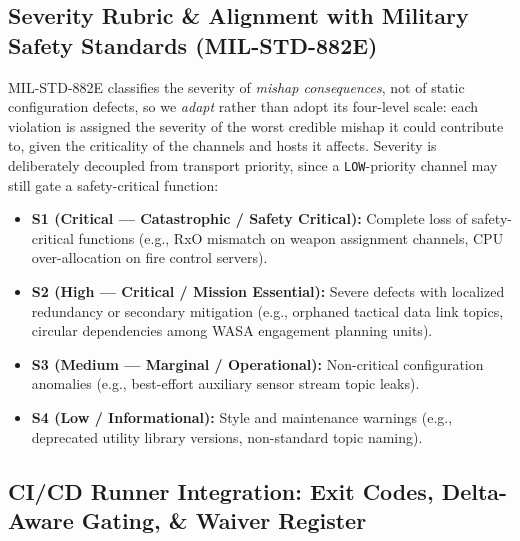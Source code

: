 \documentclass[sigconf,9pt]{acmart}
\begin{document}
\subsection{Severity Rubric \& Alignment with Military Safety Standards (MIL-STD-882E)}

MIL-STD-882E classifies the severity of \emph{mishap consequences}, not of static configuration defects, so we \emph{adapt} rather than adopt its four-level scale: each violation is assigned the severity of the worst credible mishap it could contribute to, given the criticality of the channels and hosts it affects. Severity is deliberately decoupled from transport priority, since a \texttt{LOW}-priority channel may still gate a safety-critical function:
\begin{itemize}\itemsep=0.5pt
    \item \textbf{S1 (Critical --- Catastrophic / Safety Critical):} Complete loss of safety-critical functions (e.g., RxO mismatch on weapon assignment channels, CPU over-allocation on fire control servers).
    \item \textbf{S2 (High --- Critical / Mission Essential):} Severe defects with localized redundancy or secondary mitigation (e.g., orphaned tactical data link topics, circular dependencies among WASA engagement planning units).
    \item \textbf{S3 (Medium --- Marginal / Operational):} Non-critical configuration anomalies (e.g., best-effort auxiliary sensor stream topic leaks).
    \item \textbf{S4 (Low / Informational):} Style and maintenance warnings (e.g., deprecated utility library versions, non-standard topic naming).
\end{itemize}

\subsection{CI/CD Runner Integration: Exit Codes, Delta-Aware Gating, \& Waiver Register}
\end{document}
